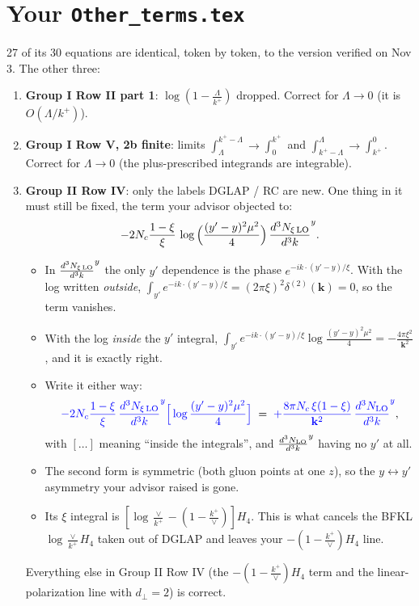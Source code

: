 \documentclass[10pt]{article}
\newcommand{\new}[1]{{\color{blue}#1}}
\newcommand{\NLO}[1]{\frac{d^3N_{#1}}{d^3k}}
\begin{document}
\section{Your \texttt{Other\_terms.tex}}
27 of its 30 equations are identical, token by token, to the version verified on Nov 3. The other three:
\begin{enumerate}
\item \textbf{Group I Row II part 1}: $\log(1-\frac{\Lambda}{k^+})$ dropped. Correct for $\Lambda\to0$ (it is $O(\Lambda/k^+)$).
\item \textbf{Group I Row V, 2b finite}: limits $\int_\Lambda^{k^+-\Lambda}\to\int_0^{k^+}$ and $\int_{k^+-\Lambda}^{\Lambda}\to\int_{k^+}^{0}$. Correct for $\Lambda\to0$ (the plus-prescribed integrands are integrable).
\item \textbf{Group II Row IV}: only the labels DGLAP / RC are new. One thing in it must still be fixed, the term your advisor objected to:
\begin{equation*}
-2N_c\frac{1-\xi}{\xi}\,\log\Big(\frac{(y'-y)^2\mu^2}{4}\Big)\,\NLO{\xi\,\rm LO}^{y}.
\end{equation*}
\begin{itemize}
\item In $\NLO{\xi\,\rm LO}^{y}$ the only $y'$ dependence is the phase $e^{-ik\cdot(y'-y)/\xi}$. With the log written \emph{outside}, $\int_{y'}e^{-ik\cdot(y'-y)/\xi}=(2\pi\xi)^2\delta^{(2)}(\mathbf k)=0$, so the term vanishes.
\item With the log \emph{inside} the $y'$ integral, $\int_{y'}e^{-ik\cdot(y'-y)/\xi}\log\frac{(y'-y)^2\mu^2}{4}=-\frac{4\pi\xi^2}{\mathbf k^2}$, and it is exactly right.
\item Write it either way:
\begin{equation*}
\new{-2N_c\frac{1-\xi}{\xi}\,\NLO{\xi\,\rm LO}^{y}\Big[\log\frac{(y'-y)^2\mu^2}{4}\Big]}\;=\;\new{+\frac{8\pi N_c\,\xi(1-\xi)}{\mathbf k^2}\,\NLO{\rm LO}^{y}},
\end{equation*}
with $[\dots]$ meaning ``inside the integrals'', and $\NLO{\rm LO}^{y}$ having no $y'$ at all.
\item The second form is symmetric (both gluon points at one $z$), so the $y\leftrightarrow y'$ asymmetry your advisor raised is gone.
\item Its $\xi$ integral is $[\log\frac{\vee}{k^+}-(1-\frac{k^+}{\vee})]H_4$. This is what cancels the BFKL $\log\frac{\vee}{k^+}H_4$ taken out of DGLAP and leaves your $-(1-\frac{k^+}{\vee})H_4$ line.
\end{itemize}
Everything else in Group II Row IV (the $-(1-\frac{k^+}{\vee})H_4$ term and the linear-polarization line with $d_\perp=2$) is correct.
\end{enumerate}
\end{document}
